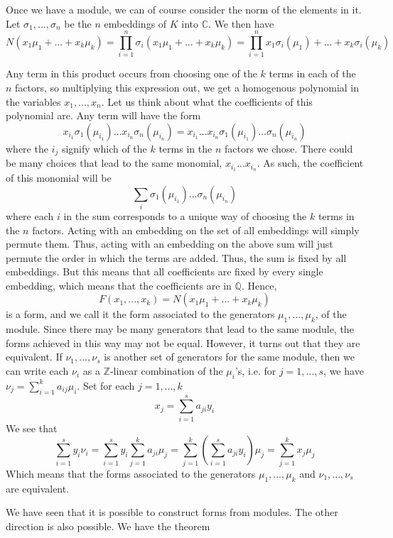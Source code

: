 \documentclass{article}
\newcommand{\mbb}[1]{\mathbb{#1}}
\begin{document}
Once we have a module, we can of course consider the norm of the elements in it. Let $\sigma_1, ..., \sigma_n$ be the $n$ embeddings of $K$ into $\mbb{C}$. We then have
$$N(x_1 \mu_1 + ... + x_k \mu_k) = \prod_{i = 1}^n \sigma_i(x_1 \mu_1 + ... + x_k \mu_k) = \prod_{i = 1}^n x_1 \sigma_i(\mu_1) + ... + x_k \sigma_i(\mu_k)$$



Any term in this product occurs from choosing one of the $k$ terms in each of the $n$ factors, so multiplying this expression out, we get a homogenous polynomial in the variables $x_1, ..., x_n$. Let us think about what the coefficients of this polynomial are. Any term will have the form
$$x_{i_1}\sigma_1(\mu_{i_1}) \dots x_{i_n}\sigma_n(\mu_{i_n}) = x_{i_1} ... x_{i_n} \sigma_1(\mu_{i_1})... \sigma_n(\mu_{i_n})$$
where the $i_j$ signify which of the $k$ terms in the $n$ factors we chose. There could be many choices that lead to the same monomial, $x_{i_1}...x_{i_n}$. As such, the coefficient of this monomial will be
$$\sum_{i} \sigma_1(\mu_{i_1})... \sigma_n(\mu_{i_n})$$
where each $i$ in the sum corresponds to a unique way of choosing the $k$ terms in the $n$ factors. Acting with an embedding on the set of all embeddings will simply permute them. Thus, acting with an embedding on the above sum will just permute the order in which the terms are added. Thus, the sum is fixed by all embeddings. But this means that all coefficients are fixed by every single embedding, which means that the coefficients are in $\mbb{Q}$. Hence, $$F(x_1, ..., x_k) = N(x_1 \mu_1 + ... + x_k \mu_k)$$ 
is a form, and we call it the form associated to the generators $\mu_1, ..., \mu_k$, of the module. Since there may be many generators that lead to the same module, the forms achieved in this way may not be equal. However, it turns out that they are equivalent. If $\nu_1, ...,\nu_s$ is another set of generators for the same module, then we can write each $\nu_i$ as a $\mbb{Z}$-linear combination of the $\mu_i$'s, i.e. for $j = 1, ..., s$, we have
$\nu_j = \sum_{i=1}^k a_{ij} \mu_i$. Set for each $j = 1, ..., k$ 
$$x_j = \sum_{i=1}^s a_{ji} y_i$$
We see that
$$\sum_{i=1}^s y_i \nu_i = \sum_{i=1}^s y_i \sum_{j=1}^k a_{ji} \mu_j = \sum_{j=1}^k (\sum_{i=1}^s a_{ji} y_i) \mu_j = \sum_{j=1}^k x_j \mu_j$$
Which means that the forms associated to the generators $\mu_1, ..., \mu_k$ and $\nu_1, ..., \nu_s$ are equivalent. 

We have seen that it is possible to construct forms from modules. The other direction is also possible. We have the theorem
\end{document}
